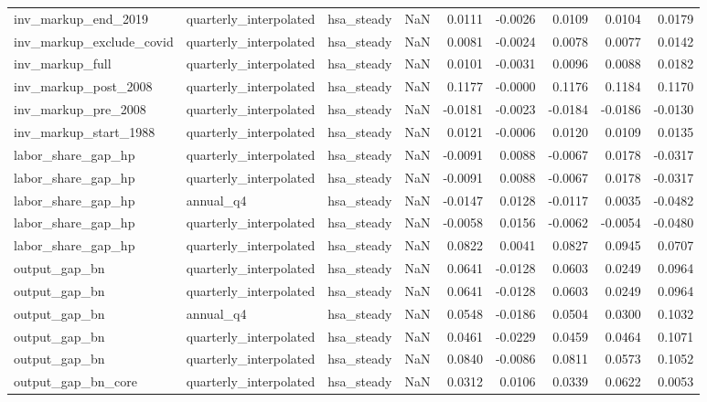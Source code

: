 \begin{tabular}{lllrrrrrr}
inv\_markup\_end\_2019 & quarterly\_interpolated & hsa\_steady & NaN & 0.0111 & -0.0026 & 0.0109 & 0.0104 & 0.0179 \\
inv\_markup\_exclude\_covid & quarterly\_interpolated & hsa\_steady & NaN & 0.0081 & -0.0024 & 0.0078 & 0.0077 & 0.0142 \\
inv\_markup\_full & quarterly\_interpolated & hsa\_steady & NaN & 0.0101 & -0.0031 & 0.0096 & 0.0088 & 0.0182 \\
inv\_markup\_post\_2008 & quarterly\_interpolated & hsa\_steady & NaN & 0.1177 & -0.0000 & 0.1176 & 0.1184 & 0.1170 \\
inv\_markup\_pre\_2008 & quarterly\_interpolated & hsa\_steady & NaN & -0.0181 & -0.0023 & -0.0184 & -0.0186 & -0.0130 \\
inv\_markup\_start\_1988 & quarterly\_interpolated & hsa\_steady & NaN & 0.0121 & -0.0006 & 0.0120 & 0.0109 & 0.0135 \\
labor\_share\_gap\_hp & quarterly\_interpolated & hsa\_steady & NaN & -0.0091 & 0.0088 & -0.0067 & 0.0178 & -0.0317 \\
labor\_share\_gap\_hp & quarterly\_interpolated & hsa\_steady & NaN & -0.0091 & 0.0088 & -0.0067 & 0.0178 & -0.0317 \\
labor\_share\_gap\_hp & annual\_q4 & hsa\_steady & NaN & -0.0147 & 0.0128 & -0.0117 & 0.0035 & -0.0482 \\
labor\_share\_gap\_hp & quarterly\_interpolated & hsa\_steady & NaN & -0.0058 & 0.0156 & -0.0062 & -0.0054 & -0.0480 \\
labor\_share\_gap\_hp & quarterly\_interpolated & hsa\_steady & NaN & 0.0822 & 0.0041 & 0.0827 & 0.0945 & 0.0707 \\
output\_gap\_bn & quarterly\_interpolated & hsa\_steady & NaN & 0.0641 & -0.0128 & 0.0603 & 0.0249 & 0.0964 \\
output\_gap\_bn & quarterly\_interpolated & hsa\_steady & NaN & 0.0641 & -0.0128 & 0.0603 & 0.0249 & 0.0964 \\
output\_gap\_bn & annual\_q4 & hsa\_steady & NaN & 0.0548 & -0.0186 & 0.0504 & 0.0300 & 0.1032 \\
output\_gap\_bn & quarterly\_interpolated & hsa\_steady & NaN & 0.0461 & -0.0229 & 0.0459 & 0.0464 & 0.1071 \\
output\_gap\_bn & quarterly\_interpolated & hsa\_steady & NaN & 0.0840 & -0.0086 & 0.0811 & 0.0573 & 0.1052 \\
output\_gap\_bn\_core & quarterly\_interpolated & hsa\_steady & NaN & 0.0312 & 0.0106 & 0.0339 & 0.0622 & 0.0053 \\

\end{tabular}
